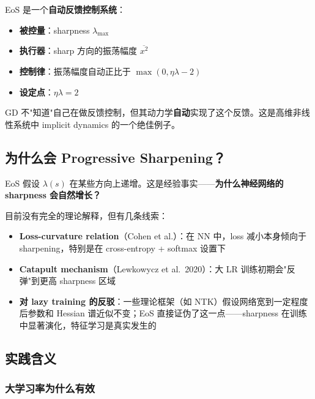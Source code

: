 \documentclass[12pt, a4paper]{ctexart}
\begin{document}
\begin{keypoint}

EoS 是一个\textbf{自动反馈控制系统}：

\begin{itemize}
\item \textbf{被控量}：sharpness $\lambda_{\max}$
\item \textbf{执行器}：sharp 方向的振荡幅度 $\overline{x^2}$
\item \textbf{控制律}：振荡幅度自动正比于 $\max(0, \eta\lambda - 2)$
\item \textbf{设定点}：$\eta\lambda = 2$
\end{itemize}

GD 不"知道"自己在做反馈控制，但其动力学\textbf{自动}实现了这个反馈。这是高维非线性系统中 implicit dynamics 的一个绝佳例子。
\end{keypoint}

\subsection{为什么会 Progressive Sharpening？}

EoS 假设 $\lambda(s)$ 在某些方向上递增。这是经验事实——\textbf{为什么神经网络的 sharpness 会自然增长？}

目前没有完全的理论解释，但有几条线索：

\begin{itemize}
\item \textbf{Loss-curvature relation}（Cohen et al.）：在 NN 中，loss 减小本身倾向于 sharpening，特别是在 cross-entropy + softmax 设置下
\item \textbf{Catapult mechanism}（Lewkowycz et al.\ 2020）：大 LR 训练初期会"反弹"到更高 sharpness 区域
\item \textbf{对 lazy training 的反驳}：一些理论框架（如 NTK）假设网络宽到一定程度后参数和 Hessian 谱近似不变；EoS 直接证伪了这一点——sharpness 在训练中显著演化，特征学习是真实发生的
\end{itemize}

\subsection{实践含义}

\subsubsection{大学习率为什么有效}
\end{document}

